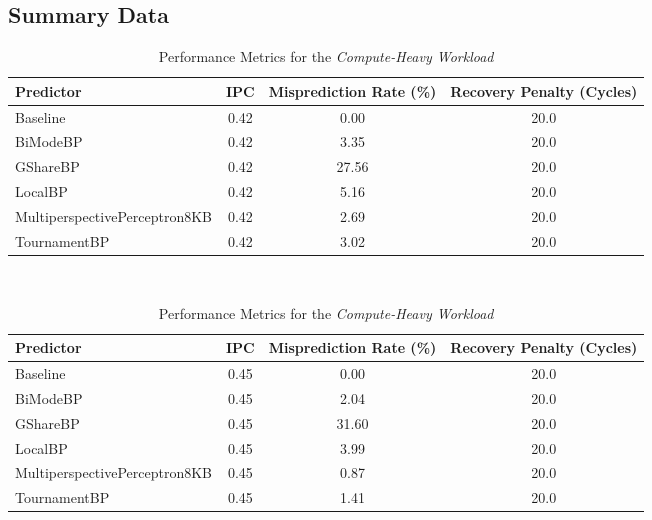 \documentclass[11pt, a4paper]{article}
\begin{document}
\subsection{Summary Data}
\begin{table}[h!]
    \centering
    \caption{Performance Metrics for the \textit{Branch-Heavy Workload}}
    \label{tab:branch_heavy_results}
    \begin{tabular}{l c c c}
        \toprule
        Predictor         & IPC   & Misprediction Rate (\%) & Recovery Penalty (Cycles) \\ \midrule
        Baseline          & 0.42  & 0.00                    & 20.0                      \\
        BiModeBP          & 0.42  & 3.35                    & 20.0                      \\
        GShareBP          & 0.42  & 27.56                   & 20.0                      \\
        LocalBP           & 0.42  & 5.16                    & 20.0                      \\
        MultiperspectivePerceptron8KB & 0.42  & 2.69                    & 20.0                      \\
        TournamentBP      & 0.42  & 3.02                    & 20.0                      \\
        \bottomrule
    \end{tabular}
    \\ \vspace{0.5cm} %
    \caption{Performance Metrics for the \textit{Compute-Heavy Workload}}
    \label{tab:compute_heavy_results}
    \begin{tabular}{l c c c}
        \toprule
        Predictor         & IPC   & Misprediction Rate (\%) & Recovery Penalty (Cycles) \\ \midrule
        Baseline          & 0.45  & 0.00                    & 20.0                      \\
        BiModeBP          & 0.45  & 2.04                    & 20.0                      \\
        GShareBP          & 0.45  & 31.60                   & 20.0                      \\
        LocalBP           & 0.45  & 3.99                    & 20.0                      \\
        MultiperspectivePerceptron8KB & 0.45  & 0.87                    & 20.0                      \\
        TournamentBP      & 0.45  & 1.41                    & 20.0                      \\
        \bottomrule
    \end{tabular}
\end{table}
\end{document}
